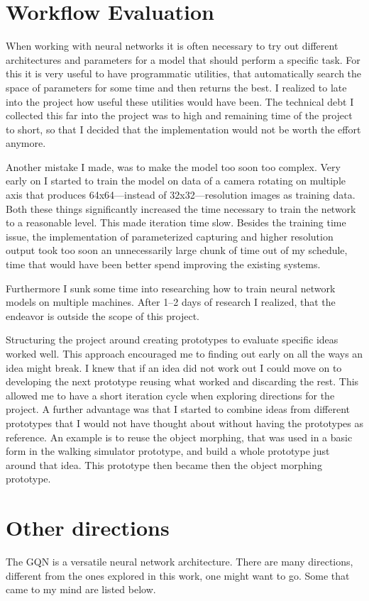 \section{Workflow Evaluation}
When working with neural networks it is often necessary to try out different architectures and parameters for a model that should perform a specific task. For this it is very useful to have programmatic utilities, that automatically search the space of parameters for some time and then returns the best. I realized to late into the project how useful these utilities would have been. The technical debt I collected this far into the project was to high and remaining time of the project to short, so that I decided that the implementation would not be worth the effort anymore.

Another mistake I made, was to make the model too soon too complex. Very early on I started to train the model on data of a camera rotating on multiple axis that produces 64x64---instead of 32x32---resolution images as training data. Both these things significantly increased the time necessary to train the network to a reasonable level. This made iteration time slow. Besides the training time issue, the implementation of parameterized capturing and higher resolution output took too soon an unnecessarily large chunk of time out of my schedule, time that would have been better spend improving the existing systems.

Furthermore I sunk some time into researching how to train neural network models on multiple machines. After 1--2 days of research I realized, that the endeavor is outside the scope of this project.

Structuring the project around creating prototypes to evaluate specific ideas worked well. This approach encouraged me to finding out early on all the ways an idea might break. I knew that if an idea did not work out I could move on to developing the next prototype reusing what worked and discarding the rest. This allowed me to have a short iteration cycle when exploring directions for the project. A further advantage was that I started to combine ideas from different prototypes that I would not have thought about without having the prototypes as reference. An example is to reuse the object morphing, that was used in a basic form in the walking simulator prototype, and build a whole prototype just around that idea. This prototype then became then the object morphing prototype.


\section{Other directions}
The GQN is a versatile neural network architecture. There are many directions, different from the ones explored in this work, one might want to go. Some that came to my mind are listed below.

